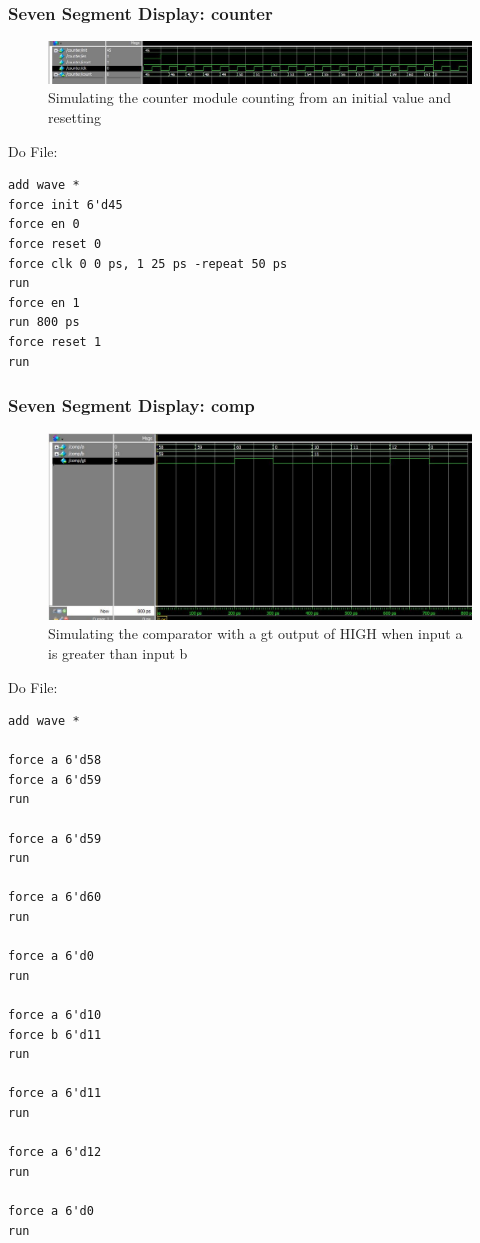 \documentclass[a4paper]{article}
\begin{document}
\subsubsection{Seven Segment Display: counter}
\begin{figure}[H]
    \includegraphics[width=0.8 \linewidth]{images/counter_sim.JPG}
    \caption{Simulating the counter module counting from an initial value and resetting}
    \label{counter_sim}
\end{figure}

Do File:
\begin{Verbatim}
add wave *
force init 6'd45
force en 0
force reset 0
force clk 0 0 ps, 1 25 ps -repeat 50 ps
run
force en 1
run 800 ps
force reset 1
run

\end{Verbatim}

\subsubsection{Seven Segment Display: comp}
\begin{figure}[H]
    \includegraphics[width=0.8 \linewidth]{images/comp_sim.JPG}
    \caption{Simulating the comparator with a gt output of HIGH when input a is greater than input b}
    \label{comp_aim}
\end{figure}

Do File:
\begin{Verbatim}
add wave *

force a 6'd58
force a 6'd59
run

force a 6'd59
run

force a 6'd60
run 

force a 6'd0
run 

force a 6'd10
force b 6'd11
run

force a 6'd11
run

force a 6'd12
run

force a 6'd0
run
\end{Verbatim}
\end{document}
